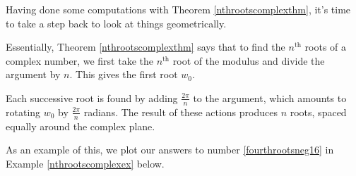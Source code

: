 \documentclass{ximera}
\begin{document}
Having done some computations with Theorem \ref{nthrootscomplexthm},  it's time to  take a step back to look at things geometrically.  

 

Essentially,  Theorem \ref{nthrootscomplexthm} says that to find the $n^{\text{th}}$ roots of a complex number,  we first take the $n^{\text{th}}$ root of the modulus and divide the argument by $n$.  This gives the first root  $w_0$. 

Each successive root is found by adding  $\frac{2\pi}{n}$ to the argument, which amounts to rotating $w_0$ by $\frac{2\pi}{n}$ radians. The result of these actions  produces $n$ roots, spaced equally around the complex plane.  

As an example of this, we plot our answers to number \ref{fourthrootsneg16} in Example \ref{nthrootscomplexex} below.
\end{document}
